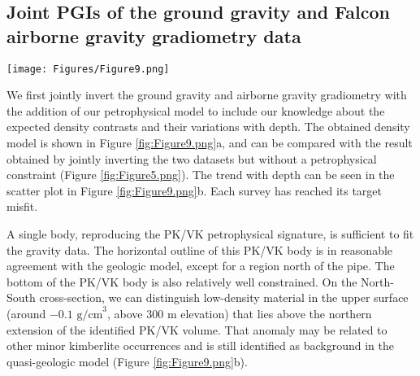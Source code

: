 \documentclass[paper, twocolumn]{geophysics} %
\begin{document}

\subsection{Joint PGIs of the ground gravity and Falcon airborne gravity gradiometry data}



\begin{figure*}%
\centering
\texttt{[image: Figures/Figure9.png]}
\caption{Inversion result with PGI of the ground gravity and Falcon surveys using the density signature of PK/VK; (a) Plan map, East-West and North-South cross-sections through the recovered density contrast model along each plane. The dotted line represents the location of each cross-section; (b) Comparison between the petrophysical GMM (contours plot) used to regularize the inversion and the recovered density contrast model (scatter plot).}
\label{fig:Figure9.png}
\end{figure*}%

We first jointly invert the ground gravity and airborne gravity gradiometry with the addition of our petrophysical model to include our knowledge about the expected density contrasts and their variations with depth. The obtained density model is shown in Figure \ref{fig:Figure9.png}a, and can be compared with the result obtained by jointly inverting the two datasets but without a petrophysical constraint (Figure \ref{fig:Figure5.png}). The trend with depth can be seen in the scatter plot in Figure \ref{fig:Figure9.png}b. Each survey has reached its target misfit.

A single body, reproducing the PK/VK petrophysical signature, is sufficient to fit the gravity data. The horizontal outline of this PK/VK body is in reasonable agreement with the geologic model, except for a region north of the pipe. The bottom of the PK/VK body is also relatively well constrained. On the North-South cross-section, we can distinguish low-density material in the upper surface (around $-0.1 \text{ g/cm}^3$, above $300$ m elevation) that lies above the northern extension of the identified PK/VK volume. That anomaly may be related to other minor kimberlite occurrences and is still identified as background in the quasi-geologic model (Figure \ref{fig:Figure9.png}b).
\end{document}
